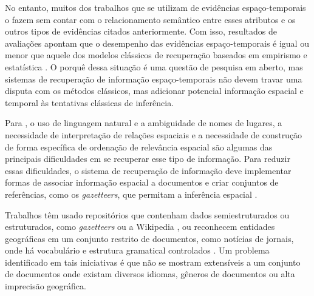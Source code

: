 No entanto, muitos dos trabalhos que se utilizam de evidências espaço-temporais o fazem sem contar com o relacionamento semântico entre esses atributos e os outros tipos de evidências citados anteriormente. Com isso, resultados de avaliações apontam que o desempenho das evidências espaço-temporais é igual ou menor que aquele dos modelos clássicos de recuperação baseados em empirismo e estatística \cite{cardosoSantos08}. O porquê dessa situação é uma questão de pesquisa em aberto, mas sistemas de recuperação de informação espaço-temporais não devem travar uma disputa com os métodos clássicos, mas adicionar potencial informação espacial e temporal às tentativas clássicas de inferência.

Para , o uso de linguagem natural e a ambiguidade de nomes de lugares, a necessidade de interpretação de relações espaciais e a necessidade de construção de forma específica de ordenação de relevância espacial são algumas das principais dificuldades em se recuperar esse tipo de informação. Para reduzir essas dificuldades, o sistema de recuperação de informação deve implementar formas de associar informação espacial a documentos e criar conjuntos de referências, como os \textit{gazetteers}, que permitam a inferência espacial \cite{hassan09,li09}.

Trabalhos têm usado repositórios que contenham dados semiestruturados ou estruturados, como \textit{gazetteers} ou a Wikipedia \cite{buscaldiRosso07}, ou reconhecem entidades geográficas em um conjunto restrito de documentos, como notícias de jornais, onde há vocabulário e estrutura gramatical controlados \cite{hassan09}. Um problema identificado em tais iniciativas é que não se mostram extensíveis a um conjunto de documentos onde existam diversos idiomas, gêneros de documentos ou alta imprecisão geográfica.

